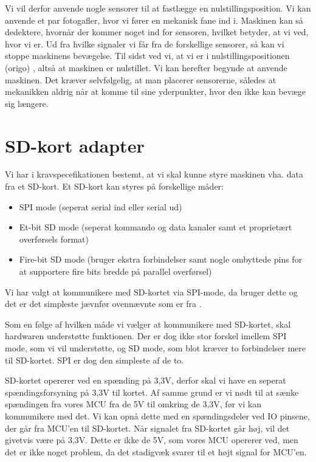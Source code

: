 Vi vil derfor anvende nogle sensorer til at fastlægge en nulstillingsposition.
Vi kan anvende et par fotogafler, hvor vi fører
en mekanisk fane ind i. Maskinen kan så dedektere, hvornår der kommer
noget ind for sensoren, hvilket betyder, at vi ved, hvor vi er. Ud fra
hvilke signaler vi får fra de forskellige sensorer, så kan vi stoppe
maskinens bevægelse. Til sidst ved vi, at vi er i nulstillingspositionen (origo)
, altså at maskinen er nulstillet. Vi kan herefter begynde at anvende
maskinen. Det kræver selvfølgelig, at man placerer sensorerne, således
at mekanikken aldrig når at komme til sine yderpunkter, hvor den ikke
kan bevæge sig længere.

\section{SD-kort adapter}
Vi har i kravspecefikationen bestemt, at vi skal kunne styre maskinen
vha. data fra et SD-kort. Et SD-kort kan styres på forskellige måder:

\begin{itemize} \firmlist
\item{SPI mode (seperat serial ind eller serial ud)}
\item{Et-bit SD mode (seperat kommando og data kanaler samt et
    proprietært overførsels format)}
\item{Fire-bit SD mode (bruger ekstra forbindelser samt nogle
    ombyttede pins for at supportere fire bits bredde på parallel
    overførsel)}
\end{itemize}

Vi har valgt at kommunikere med SD-kortet via SPI-mode, da
\cite{web:captain-mmc} bruger dette og det er det simpleste jævnfør
ovennævnte som er fra \cite{web:sd-pinout}.

Som en følge af hvilken måde vi vælger at kommunikere med SD-kortet,
skal hardwaren understøtte funktionen. Der er dog ikke stor forskel imellem
SPI mode, som vi vil understøtte, og SD mode, som blot kræver to
forbindelser mere til SD-kortet. SPI er dog den simpleste
af de to.

SD-kortet opererer ved en spænding på 3,3V, derfor skal vi have en
seperat spændingsforsyning på 3,3V til kortet. Af samme grund er vi
nødt til at sænke spændingen fra vores MCU fra de 5V til omkring de
3,3V, før vi kan kommunikere med det. Vi kan opnå dette med en
spændingsdeler ved IO pinsene, der går fra MCU'en til SD-kortet. Når
signalet fra SD-kortet går høj, vil det givetvis være på 3,3V. Dette
er ikke de 5V, som vores MCU opererer ved, men det er ikke noget
problem, da det stadigvæk svarer til et højt signal for MCU'en.


